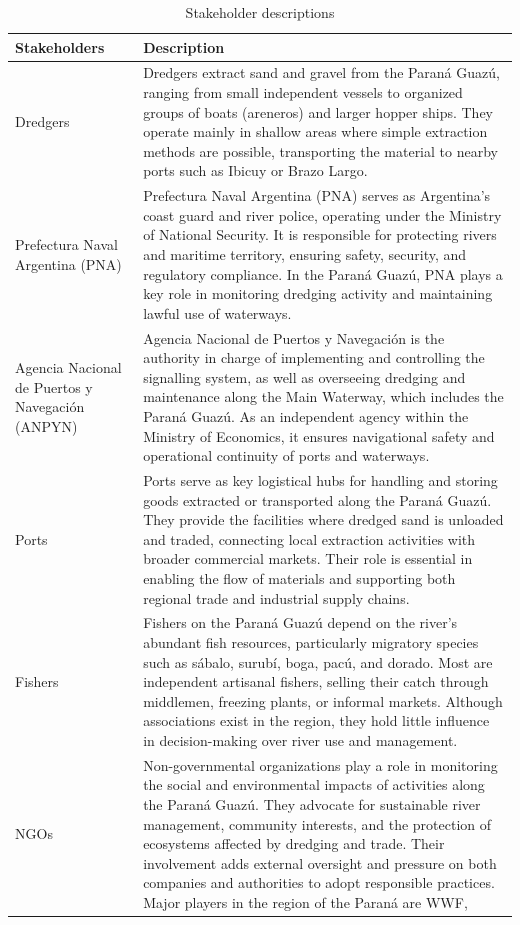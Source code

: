 \begin{table}[H]
\caption{Stakeholder descriptions}
\centering
\begin{tabularx}{\linewidth}{p{3.5cm}X} %
\toprule
Stakeholders & Description \\
\midrule
Dredgers & Dredgers extract sand and gravel from the Paraná Guazú, ranging from small independent vessels to organized groups of boats (areneros) and larger hopper ships. They operate mainly in shallow areas where simple extraction methods are possible, transporting the material to nearby ports such as Ibicuy or Brazo Largo. \\
\midrule
Prefectura Naval Argentina (PNA) & Prefectura Naval Argentina (PNA) serves as Argentina’s coast guard and river police, operating under the Ministry of National Security. It is responsible for protecting rivers and maritime territory, ensuring safety, security, and regulatory compliance. In the Paraná Guazú, PNA plays a key role in monitoring dredging activity and maintaining lawful use of waterways. \\
\midrule
Agencia Nacional de Puertos y Navegación (ANPYN) & Agencia Nacional de Puertos y Navegación is the authority in charge of implementing and controlling the signalling system, as well as overseeing dredging and maintenance along the Main Waterway, which includes the Paraná Guazú. As an independent agency within the Ministry of Economics, it ensures navigational safety and operational continuity of ports and waterways. \\
\midrule
Ports & Ports serve as key logistical hubs for handling and storing goods extracted or transported along the Paraná Guazú. They provide the facilities where dredged sand is unloaded and traded, connecting local extraction activities with broader commercial markets. Their role is essential in enabling the flow of materials and supporting both regional trade and industrial supply chains. \\
\midrule
Fishers & Fishers on the Paraná Guazú depend on the river’s abundant fish resources, particularly migratory species such as sábalo, surubí, boga, pacú, and dorado. Most are independent artisanal fishers, selling their catch through middlemen, freezing plants, or informal markets. Although associations exist in the region, they hold little influence in decision-making over river use and management. \\
\midrule
NGOs & Non-governmental organizations play a role in monitoring the social and environmental impacts of activities along the Paraná Guazú. They advocate for sustainable river management, community interests, and the protection of ecosystems affected by dredging and trade. Their involvement adds external oversight and pressure on both companies and authorities to adopt responsible practices. Major players in the region of the Paraná are WWF,   \\

\end{tabularx}
\end{table}
